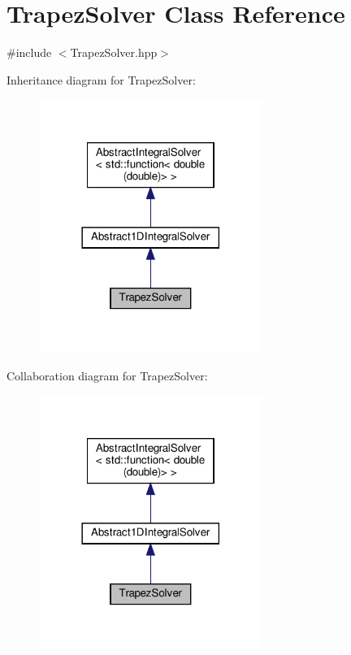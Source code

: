 \hypertarget{class_trapez_solver}{}\section{Trapez\+Solver Class Reference}
\label{class_trapez_solver}


{\ttfamily \#include $<$Trapez\+Solver.\+hpp$>$}



Inheritance diagram for Trapez\+Solver\+:
\nopagebreak
\begin{figure}[H]
\begin{center}
\leavevmode
\includegraphics[width=206pt]{class_trapez_solver__inherit__graph}
\end{center}
\end{figure}


Collaboration diagram for Trapez\+Solver\+:
\nopagebreak
\begin{figure}[H]
\begin{center}
\leavevmode
\includegraphics[width=206pt]{class_trapez_solver__coll__graph}
\end{center}
\end{figure}

